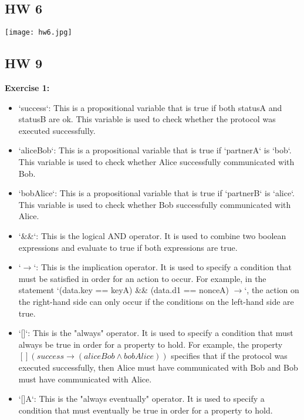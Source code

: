 \documentclass{article}
\theoremstyle{theorem}
\theoremstyle{definition}
\theoremstyle{remark}
\begin{document}
\subsection{HW 6}

    \texttt{[image: hw6.jpg]}

\subsection{HW 9}

{\bf Exercise 1:}

\begin{itemize}
\item `success`: This is a propositional variable that is true if both statusA and statusB are ok. This variable is used to check whether the protocol was executed successfully.
\item `aliceBob`: This is a propositional variable that is true if `partnerA` is `bob`. This variable is used to check whether Alice successfully communicated with Bob.

\item `bobAlice`: This is a propositional variable that is true if `partnerB` is `alice`. This variable is used to check whether Bob successfully communicated with Alice.

\item `\&\&`: This is the logical AND operator. It is used to combine two boolean expressions and evaluate to true if both expressions are true.

\item `$\rightarrow$`: This is the implication operator. It is used to specify a condition that must be satisfied in order for an action to occur. For example, in the statement `(data.key == keyA) \&\& (data.d1 == nonceA) $\rightarrow$`, the action on the right-hand side can only occur if the conditions on the left-hand side are true.

\item `[]`: This is the "always" operator. It is used to specify a condition that must always be true in order for a property to hold. For example, the property $[] (success \rightarrow (aliceBob \land bobAlice))$ specifies that if the protocol was executed successfully, then Alice must have communicated with Bob and Bob must have communicated with Alice.

\item `[]A`: This is the "always eventually" operator. It is used to specify a condition that must eventually be true in order for a property to hold.

\end{itemize}
\end{document}
